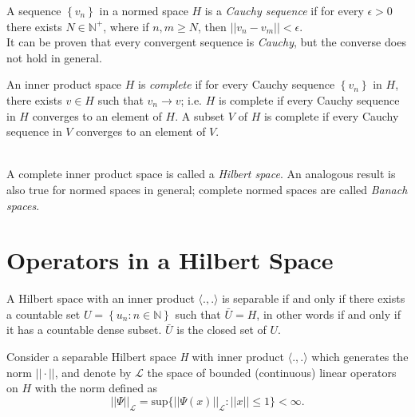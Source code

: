 \begin{definition}
A sequence $\left\{v_n\right\}$ in a normed space $H$ is a \textit{Cauchy sequence} if for every $\epsilon > 0$ there exists $N \in \mathbb{N}^{+}$, where if $n,m \geq N$, then $||v_n - v_m|| < \epsilon$.\\
It can be proven that every convergent sequence is \textit{Cauchy}, but the converse does not hold in general.
\end{definition}

\begin{definition}
An inner product space $H$ is \textit{complete} if for every Cauchy sequence $\left\{v_n\right\}$ in $H$, there exists $v \in H$ such that $v_n \rightarrow v$; i.e. $H$ is complete if every Cauchy sequence in $H$ converges to an element of $H$. A subset $V$ of $H$ is complete if every Cauchy sequence in $V$ converges to an element of $V$.
\end{definition}\\

A complete inner product space is called a \textit{Hilbert space}. An analogous result is also true for normed spaces in general; complete normed spaces are called \textit{Banach spaces}.
\clearpage
\section{Operators in a Hilbert Space}\label{Op_Hilb_Space_1}
\begin{definition}
A Hilbert space with an inner product $\langle.,. \rangle$ is separable if and only if there exists a countable set $U = \left\{u_n : n \in \mathbb{N} \right\}$ such that $\bar{U} = H$, in other words if and only if it has a countable dense subset. $\bar{U}$ is the closed set of $U$. 
\end{definition}

Consider a separable Hilbert space \textit{H} with inner product $\langle.,. \rangle$ which generates the norm $||\cdot||$, and denote by $\mathcal{L}$ the space of bounded (continuous) linear operators on $H$ with the norm defined as
\begin{equation}
||\Psi||_{\mathcal{L}} = \text{sup}\{||\Psi(x)||_{\mathcal{L}} : ||x|| \leq 1\} < \infty.
\end{equation}

